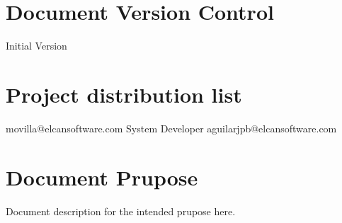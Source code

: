 \section{Document Version Control}
\begin{elcanversions}
	 {Initial Version}
\end{elcanversions}

\section{Project distribution list}

\begin{elcandistribution}

	 {movilla@elcansoftware.com} {\distribdate} 
	 {System Developer} {aguilarjpb@elcansoftware.com} {\distribdate}
	
\end{elcandistribution}

\section{Document Prupose}
Document description for the intended prupose here.


